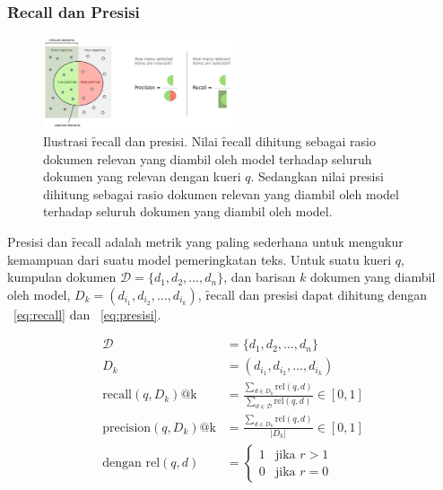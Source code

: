         \subsubsection{\f{Recall} dan Presisi}

        \begin{figure}
            \centering
            \includegraphics[width=0.50\textwidth]{assets/pics/recall-presisi.png}
            \caption{Ilustrasi \f{recall} dan presisi. Nilai \f{recall} dihitung sebagai rasio dokumen relevan yang diambil oleh model terhadap seluruh dokumen yang relevan dengan kueri $q$. Sedangkan nilai presisi dihitung sebagai rasio dokumen relevan yang diambil oleh model terhadap seluruh dokumen yang diambil oleh model.}
            \label{fig:recall-precision}
        \end{figure}
        
        Presisi dan \f{recall} adalah metrik yang paling sederhana untuk mengukur kemampuan dari suatu model pemeringkatan teks. Untuk suatu kueri $q$, kumpulan dokumen $\mathcal{D} = \{d_1, d_2, ..., d_n\}$, dan barisan $k$ dokumen yang diambil oleh model, $D_k = (d_{i_1}, d_{i_2}, ..., d_{i_k})$, \f{recall} dan presisi dapat dihitung dengan \equ~\ref{eq:recall} dan \equ~\ref{eq:presisi}.

        \begin{align}
            \label{eq:recall}
            \mathcal{D} &= \{d_1, d_2, \dots, d_n\} \\
            D_k &= (d_{i_1}, d_{i_2}, \dots, d_{i_k}) \\
            \text{recall}(q, D_k)\text{@k} &= \frac{\sum_{d \in D_k} \text{rel}(q, d)}{\sum_{d \in \mathcal{D}} \text{rel}(q, d)} \in [0, 1] \\
            \label{eq:presisi}
            \text{precision}(q, D_k)\text{@k} &= \frac{\sum_{d \in D_k} \text{rel}(q, d)}{|D_k|} \in [0, 1] \\
            \label{eq:rel}
            \text{dengan } \text{rel}(q, d) &= \begin{cases} 
            1 & \text{jika } r > 1 \\
            0 & \text{jika } r = 0
            \end{cases}        
        \end{align}

